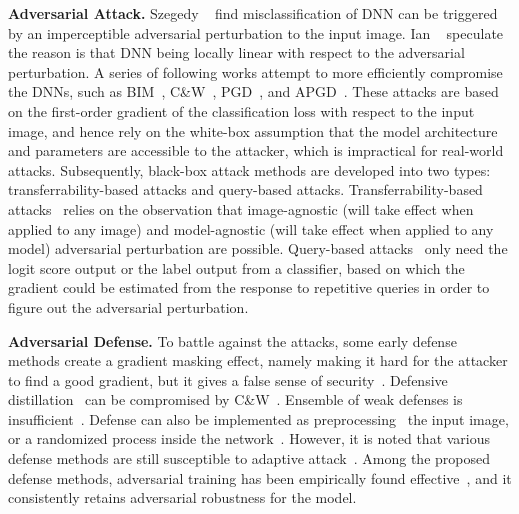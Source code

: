 \documentclass[10pt,twocolumn,letterpaper]{article}
\begin{document}
\textbf{Adversarial Attack.}
%
Szegedy \etal~\cite{l-bfgs} find misclassification of DNN can be triggered by
an imperceptible adversarial perturbation to the input image.
%
Ian \etal~\cite{fgsm} speculate the reason is that DNN being locally linear
with respect to the adversarial perturbation.
%
A series of following works attempt to more efficiently compromise the DNNs,
such as BIM~\cite{i-fgsm}, C\&W~\cite{cw}, PGD~\cite{madry}, and
APGD~\cite{apgd}.
%
These attacks are based on the first-order gradient of the classification loss
with respect to the input image, and hence rely on the white-box assumption
that the model architecture and parameters are accessible to the attacker,
which is impractical for real-world attacks.
%
Subsequently, black-box attack methods are developed into two types:
transferrability-based attacks and query-based attacks.
%
Transferrability-based attacks~\cite{di-fgsm,universal} relies on the
observation that image-agnostic (will take effect when applied to any image)
and model-agnostic (will take effect when applied to any model) adversarial
perturbation are possible.
%
Query-based attacks~\cite{nes-atk,spsa-atk} only need the logit score output or
the label output from a classifier, based on which the gradient could be
estimated from the response to repetitive queries in order to figure out the
adversarial perturbation.

\textbf{Adversarial Defense.}
%
To battle against the attacks, some early defense methods create a gradient
masking effect, namely making it hard for the attacker to find a good gradient,
but it gives a false sense of security~\cite{obfuscated}.
%
Defensive distillation~\cite{distill2} can be compromised by C\&W~\cite{cw}.
%
Ensemble of weak defenses is insufficient~\cite{ensembleweak}.
%
Defense can also be implemented as preprocessing~\cite{deflecting} the input
image, or a randomized process inside the network~\cite{self-ensemble}.
%
However, it is noted that various defense methods are still susceptible to
adaptive attack~\cite{adaptive}.
%
Among the proposed defense methods, adversarial training has been empirically
found effective~\cite{bilateral,advtrain-triplet,benchmarking}, and it
consistently retains adversarial robustness for the model.
\end{document}

